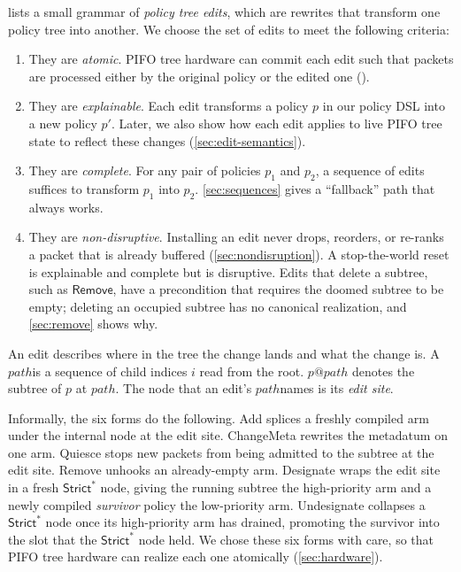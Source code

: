 \documentclass[sigplan,anonymous,review,nonacm]{acmart}
\newcommand{\notation}[1]{\ensuremath{#1}\ifmmode\else\xspace\fi}
\newcommand{\pth}{\notation{\mathit{path}}}
\newcommand{\Strictstar}{\textsf{Strict}^{*}}
\newcommand{\Add}{\textsf{Add}}
\newcommand{\ChangeMeta}{\textsf{ChangeMeta}}
\newcommand{\Quiesce}{\textsf{Quiesce}}
\newcommand{\Remove}{\textsf{Remove}}
\newcommand{\Designate}{\textsf{Designate}}
\newcommand{\Undesignate}{\textsf{Undesignate}}
\begin{document}
 lists a small grammar of \emph{policy tree edits}, which are rewrites that transform one policy tree into another.
We choose the set of edits to meet the following criteria:
%
\begin{enumerate}
\item They are \emph{atomic}. PIFO tree hardware can commit each edit such that packets are processed either by the original policy or the edited one ().
\item They are \emph{explainable}. Each edit transforms a policy $p$ in our policy DSL into a new policy $p'$. Later, we also show how each edit applies to live PIFO tree state to reflect these changes (\cref{sec:edit-semantics}).
\item They are \emph{complete}. For any pair of policies $p_1$ and $p_2$, a sequence of edits suffices to transform $p_1$ into $p_2$. \cref{sec:sequences} gives a ``fallback'' path that always works.
\item They are \emph{non-disruptive}. Installing an edit never drops, reorders, or re-ranks a packet that is already buffered (\cref{sec:nondisruption}). A stop-the-world reset is explainable and complete but is disruptive. Edits that delete a subtree, such as $\Remove$, have a precondition that requires the doomed subtree to be empty; deleting an occupied subtree has no canonical realization, and \cref{sec:remove} shows why.
\end{enumerate}
%
An edit describes where in the tree the change lands and what the change is.
A \pth is a sequence of child indices \(i\) read from the root.
\(p@\mathit{path}\) denotes the subtree of $p$ at \pth.
The node that an edit's \pth names is its \emph{edit site}.

Informally, the six forms do the following.
\Add{} splices a freshly compiled arm under the internal node at the edit site.
\ChangeMeta{} rewrites the metadatum on one arm.
\Quiesce{} stops new packets from being admitted to the subtree at the edit site.
\Remove{} unhooks an already-empty arm.
\Designate{} wraps the edit site in a fresh \(\Strictstar\) node, giving the running subtree the high-priority arm and a newly compiled \emph{survivor} policy the low-priority arm.
\Undesignate{} collapses a \(\Strictstar\) node once its high-priority arm has drained, promoting the survivor into the slot that the \(\Strictstar\) node held.
We chose these six forms with care, so that PIFO tree hardware can realize each one atomically (\cref{sec:hardware}).
\end{document}
